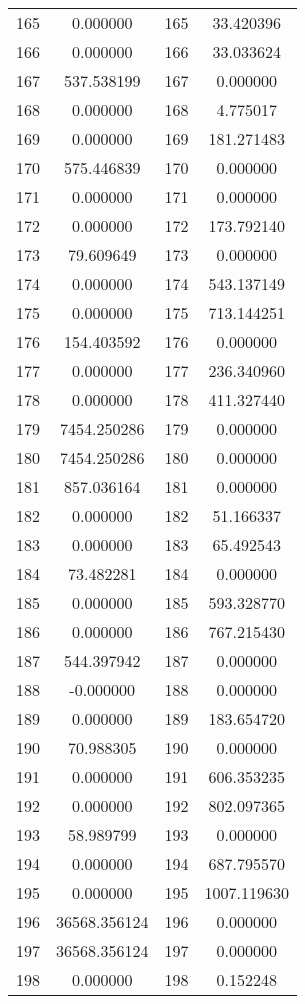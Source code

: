 \documentclass[12pt]{article}
\begin{document}
\begin{longtable}{@{}cccc@{}}
165 & 0.000000 & 165 & 33.420396 \\
166 & 0.000000 & 166 & 33.033624 \\
167 & 537.538199 & 167 & 0.000000 \\
168 & 0.000000 & 168 & 4.775017 \\
169 & 0.000000 & 169 & 181.271483 \\
170 & 575.446839 & 170 & 0.000000 \\
171 & 0.000000 & 171 & 0.000000 \\
172 & 0.000000 & 172 & 173.792140 \\
173 & 79.609649 & 173 & 0.000000 \\
174 & 0.000000 & 174 & 543.137149 \\
175 & 0.000000 & 175 & 713.144251 \\
176 & 154.403592 & 176 & 0.000000 \\
177 & 0.000000 & 177 & 236.340960 \\
178 & 0.000000 & 178 & 411.327440 \\
179 & 7454.250286 & 179 & 0.000000 \\
180 & 7454.250286 & 180 & 0.000000 \\
181 & 857.036164 & 181 & 0.000000 \\
182 & 0.000000 & 182 & 51.166337 \\
183 & 0.000000 & 183 & 65.492543 \\
184 & 73.482281 & 184 & 0.000000 \\
185 & 0.000000 & 185 & 593.328770 \\
186 & 0.000000 & 186 & 767.215430 \\
187 & 544.397942 & 187 & 0.000000 \\
188 & -0.000000 & 188 & 0.000000 \\
189 & 0.000000 & 189 & 183.654720 \\
190 & 70.988305 & 190 & 0.000000 \\
191 & 0.000000 & 191 & 606.353235 \\
192 & 0.000000 & 192 & 802.097365 \\
193 & 58.989799 & 193 & 0.000000 \\
194 & 0.000000 & 194 & 687.795570 \\
195 & 0.000000 & 195 & 1007.119630 \\
196 & 36568.356124 & 196 & 0.000000 \\
197 & 36568.356124 & 197 & 0.000000 \\
198 & 0.000000 & 198 & 0.152248 \\

\end{longtable}
\end{document}
